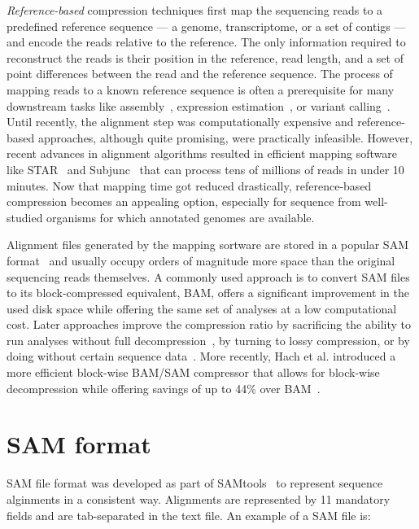 \documentclass[12pt]{cmuthesis}
\makeatletter
\newcommand{\etal}{et al.\@\xspace}
\makeatother
\begin{document}


  \textit{Reference-based} compression techniques first map the sequencing reads to a predefined reference sequence --- a genome, transcriptome, or a set of contigs --- and encode the reads relative to the reference. The only information required to reconstruct the reads is their position in the reference, read length, and a set of point differences between the read and the reference sequence. The process of mapping reads to a known reference sequence is often a prerequisite for many downstream tasks like assembly~\cite{Assembly}, expression estimation~\cite{Cufflinks,RSEM}, or variant calling~\cite{GATK}. Until recently, the alignment step was computationally expensive and reference-based approaches, although quite promising, were practically infeasible. However, recent advances in alignment algorithms resulted in efficient mapping software like STAR~\cite{DobinSTAR} and Subjunc~\cite{Subread} that can process tens of millions of reads in under 10 minutes. Now that mapping time got reduced drastically, reference-based compression becomes an appealing option, especially for sequence from well-studied organisms for which annotated genomes are available.

  Alignment files generated by the mapping sortware are stored in a popular SAM format~\cite{SamTools} and usually occupy orders of magnitude more space than the original sequencing reads themselves. A commonly used approach is to convert SAM files to its block-compressed equivalent, BAM, offers a significant improvement in the used disk space while offering the same set of analyses at a low computational cost. Later approaches improve the compression ratio by sacrificing the ability to run analyses without full decompression~\cite{Goby,Jones2012}, by turning to lossy compression, or by doing without certain sequence data~\cite{SlimGene,CRAM}. More recently, Hach \etal introduced a more efficient block-wise BAM/SAM compressor that allows for block-wise decompression while offering savings of up to 44\% over BAM~\cite{Sahinalp2015}.

\section{SAM format}

  SAM file format was developed as part of SAMtools~\cite{SamTools} to represent sequence alginments in a consistent way. Alignments are represented by 11 mandatory fields and are tab-separated in the text file. An example of a SAM file is:
\end{document}
